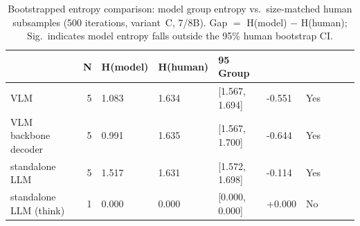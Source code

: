 \begin{table}[t]
\centering
\caption{Bootstrapped entropy comparison: model group entropy vs.\ size-matched human subsamples (500 iterations, variant~C, 7/8B). Gap $=$ H(model) $-$ H(human); Sig.\ indicates model entropy falls outside the 95\% human bootstrap CI.}
\label{tab:entropy_bootstrap}
\small
\begin{tabular}{lrlllll}
\toprule
 & N & H(model) & H(human) & 95%
Group &  &  &  &  &  &  \\
\midrule
VLM & 5 & 1.083 & 1.634 & [1.567, 1.694] & -0.551 & Yes \\
VLM backbone decoder & 5 & 0.991 & 1.635 & [1.567, 1.700] & -0.644 & Yes \\
standalone LLM & 5 & 1.517 & 1.631 & [1.572, 1.698] & -0.114 & Yes \\
standalone LLM (think) & 1 & 0.000 & 0.000 & [0.000, 0.000] & +0.000 & No \\
\bottomrule
\end{tabular}
\end{table}
